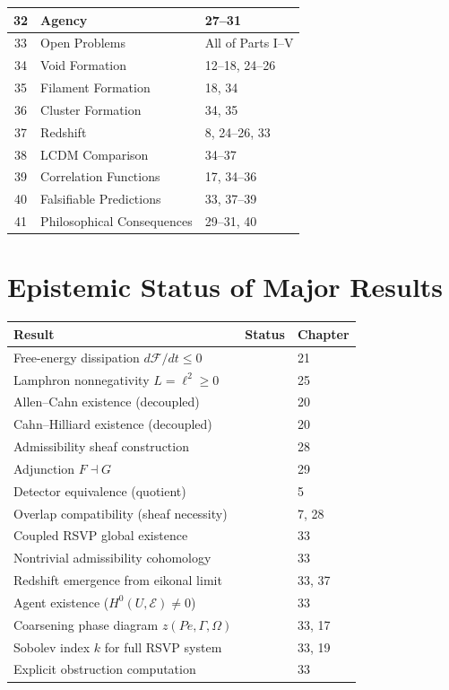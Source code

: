 \begin{center}
\begin{tabular}{@{}cll@{}}
32 & Agency              & 27--31 \\
\midrule
33 & Open Problems       & All of Parts I--V \\
\midrule
34 & Void Formation      & 12--18, 24--26 \\
35 & Filament Formation  & 18, 34 \\
36 & Cluster Formation   & 34, 35 \\
37 & Redshift            & 8, 24--26, 33 \\
38 & LCDM Comparison     & 34--37 \\
39 & Correlation Functions & 17, 34--36 \\
40 & Falsifiable Predictions & 33, 37--39 \\
41 & Philosophical Consequences & 29--31, 40 \\
\bottomrule
\end{tabular}
\end{center}

\section*{Epistemic Status of Major Results}

\begin{center}
\begin{tabular}{@{}lll@{}}
\toprule
\textbf{Result} & \textbf{Status} & \textbf{Chapter} \\
\midrule
Free-energy dissipation $d\mathcal{F}/dt \leq 0$
  & \statusproven{} & 21 \\
Lamphron nonnegativity $L = \ell^2 \geq 0$
  & \statusproven{} & 25 \\
Allen--Cahn existence (decoupled)
  & \statusproven{} & 20 \\
Cahn--Hilliard existence (decoupled)
  & \statusproven{} & 20 \\
Admissibility sheaf construction
  & \statusproven{} & 28 \\
Adjunction $F \dashv G$
  & \statusproven{} & 29 \\
Detector equivalence (quotient)
  & \statusproven{} & 5 \\
Overlap compatibility (sheaf necessity)
  & \statusproven{} & 7, 28 \\
\midrule
Coupled RSVP global existence
  & \statusconjectured{} & 33 \\
Nontrivial admissibility cohomology
  & \statusconjectured{} & 33 \\
Redshift emergence from eikonal limit
  & \statusconjectured{} & 33, 37 \\
Agent existence ($H^0(U,\mathcal{E})\neq 0$)
  & \statusconjectured{} & 33 \\
Coarsening phase diagram $z(Pe,\Gamma,\Omega)$
  & \statusopen{} & 33, 17 \\
Sobolev index $k$ for full RSVP system
  & \statusopen{} & 33, 19 \\
Explicit obstruction computation
  & \statusopen{} & 33 \\
\bottomrule
\end{tabular}
\end{center}

